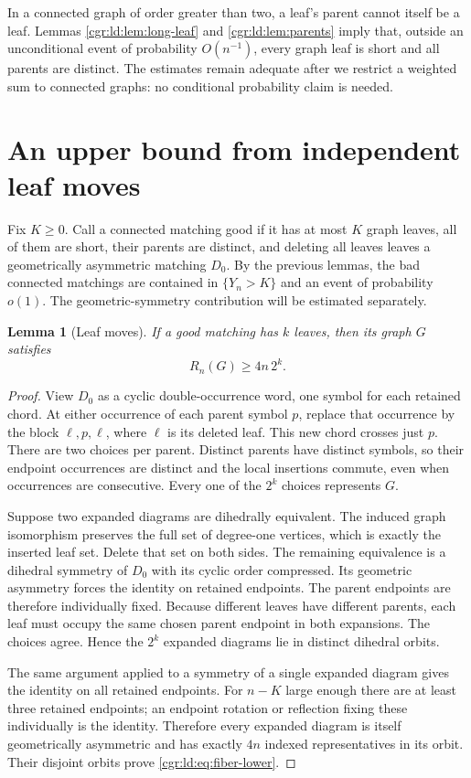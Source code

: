 \documentclass[11pt,letterpaper]{article}
\numberwithin{equation}{section}
\newtheorem{lemma}[theorem]{Lemma}
\theoremstyle{definition}\newtheorem{definition}[theorem]{Definition}
\theoremstyle{remark}\newtheorem{remark}[theorem]{Remark}
\begin{document}
In a connected graph of order greater than two, a leaf's parent
cannot itself be a leaf. Lemmas \ref{cgr:ld:lem:long-leaf} and
\ref{cgr:ld:lem:parents} imply that, outside an unconditional event of
probability $O(n^{-1})$, every graph leaf is short and all parents
are distinct. The estimates remain adequate after we restrict a
weighted sum to connected graphs: no conditional probability
claim is needed.

\section{An upper bound from independent leaf moves}\label{cgr:ld:sec:upper}
Fix $K\ge0$. Call a connected matching good if it has at most
$K$ graph leaves, all of them are short, their parents are distinct,
and deleting all leaves leaves a geometrically asymmetric matching
$D_0$. By the previous lemmas, the bad connected matchings are
contained in $\{Y_n>K\}$ and an event of probability $o(1)$.
The geometric-symmetry contribution will be estimated separately.

\begin{lemma}[Leaf moves]\label{cgr:ld:lem:leaf-moves}
If a good matching has $k$ leaves, then its graph $G$ satisfies
\begin{equation}\label{cgr:ld:eq:fiber-lower}
 R_n(G)\ge4n\,2^k.
\end{equation}
\end{lemma}
\begin{proof}
View $D_0$ as a cyclic double-occurrence word, one symbol for each
retained chord. At either occurrence of each parent symbol $p$,
replace that occurrence by the block $\ell,p,\ell$, where
$\ell$ is its deleted leaf. This new chord crosses just $p$.
There are two choices per parent. Distinct parents have distinct
symbols, so their endpoint occurrences are distinct and the local
insertions commute, even when occurrences are consecutive.
Every one of the $2^k$ choices represents $G$.

Suppose two expanded diagrams are dihedrally equivalent. The
induced graph isomorphism preserves the full set of degree-one
vertices, which is exactly the inserted leaf set. Delete that set
on both sides. The remaining equivalence is a dihedral symmetry
of $D_0$ with its cyclic order compressed. Its geometric
asymmetry forces the identity on retained endpoints. The parent
endpoints are therefore individually fixed. Because different
leaves have different parents, each leaf must occupy the same
chosen parent endpoint in both expansions. The choices agree.
Hence the $2^k$ expanded diagrams lie in distinct dihedral orbits.

The same argument applied to a symmetry of a single expanded
diagram gives the identity on all retained endpoints. For $n-K$
large enough there are at least three retained endpoints; an
endpoint rotation or reflection fixing these individually is the
identity. Therefore every expanded diagram is itself geometrically
asymmetric and has exactly $4n$ indexed representatives in its
orbit. Their disjoint orbits prove \eqref{cgr:ld:eq:fiber-lower}.
\end{proof}
\end{document}
